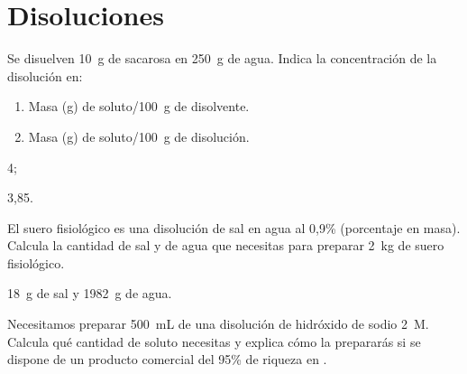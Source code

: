 \section{Disoluciones}

\begin{exercise}[
    tags    = {termodinámica, entalpía, entalpia de reacción, calor},
    topics  = {química, termoquímica, termodinámica},
    source  = {FQ 1B OXF 2015, p78, e9},
  ]
  Se disuelven \SI{10}{\gram} de sacarosa en \SI{250}{\gram} de agua. Indica la concentración de la disolución en:
  \begin{enumerate}
    \item Masa (\si{\gram}) de soluto/\SI{100}{\gram} de disolvente.
    \item Masa (\si{\gram}) de soluto/\SI{100}{\gram} de disolución.
  \end{enumerate}
\end{exercise}

\begin{solution}
  \begin{enumerate*}
    \item 4;
    \item 3,85.
  \end{enumerate*}
\end{solution}



\begin{exercise}[
    tags    = {termodinámica, entalpía, entalpia de reacción, calor},
    topics  = {química, termoquímica, termodinámica},
    source  = {FQ 1B SAN 2015, p92, e25},
  ]
  El suero fisiológico es una disolución de sal en agua al 0,9\%
  (porcentaje en masa). Calcula la cantidad de sal y de agua
  que necesitas para preparar \SI{2}{\kilo\gram} de suero fisiológico.
\end{exercise}

\begin{solution}
  \SI{18}{\gram} de sal y \SI{1982}{\gram} de agua.
\end{solution}




\begin{exercise}[
    tags    = {termodinámica, entalpía, entalpia de reacción, calor},
    topics  = {química, termoquímica, termodinámica},
    source  = {FQ 1B SAN 2015, p92, e28},
  ]
  Necesitamos preparar \SI{500}{\milli\liter} de una disolución de hidróxido de sodio \SI{2}{M}. Calcula qué cantidad de soluto necesitas y explica cómo la prepararás si se dispone de un producto comercial del 95\% de riqueza en .
\end{exercise}

